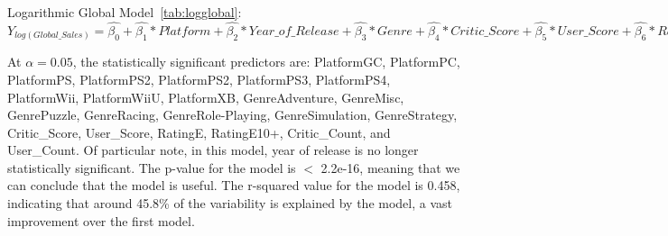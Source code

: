 \documentclass[12pt]{article}
\begin{document}
\begin{table}[ht]
\end{table}


Logarithmic Global Model~\ref{tab:logglobal}:
$Y_{log(Global\_Sales)}=\hat{\beta_{0}}+\hat{\beta_{1}}*Platform+\hat{\beta_{2}}*Year\_of\_Release+\hat{\beta_{3}}*Genre+\hat{\beta_{4}}*Critic\_Score+\hat{\beta_{5}}*User\_Score+\hat{\beta_{6}}*Rating+\hat{\beta_{7}}*Critic\_Count+\hat{\beta_{8}}*Critic\_Count$

At $\alpha=0.05$, the statistically significant predictors are: PlatformGC, PlatformPC, PlatformPS, PlatformPS2, PlatformPS2, PlatformPS3,
PlatformPS4, PlatformWii, PlatformWiiU, PlatformXB, GenreAdventure, GenreMisc, GenrePuzzle, GenreRacing, GenreRole-Playing, GenreSimulation,
GenreStrategy, Critic\_Score, User\_Score, RatingE, RatingE10+, Critic\_Count, and User\_Count. Of particular note, in this model, year of release is no longer statistically significant. 
The p-value for the model is $<$ 2.2e-16, meaning that we can conclude that the model is useful. The r-squared value for the model is 0.458,
indicating that around 45.8\% of the variability is explained by the model, a vast improvement over the first model.
\end{document}

